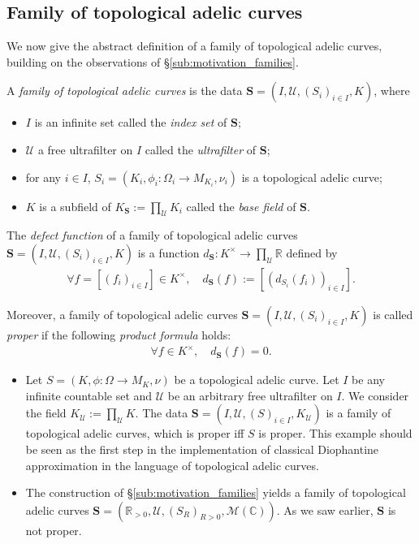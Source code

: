 \documentclass [11pt,reqno]{amsart}
\def\bC{{\mathbb{C}}}
\def\bR{{\mathbb{R}}}
\newcommand{\1}{\mathmybb{1}}
\def\cM{{\mathcal{M}}}
\def\cU{{\mathcal{U}}}
\begin{document}
\subsection{Family of topological adelic curves}
\label{sub:family_tac}

We now give the abstract definition of a family of topological adelic curves, building on the observations of \S \ref{sub:motivation_families}.

\begin{definition}
\label{def:family_of_tac}
A \emph{family of topological adelic curves} is the data $\mathbf{S}=(I,\cU,(S_{i})_{i\in I},K)$, where
\begin{itemize}
	\item $I$ is an infinite set called the \emph{index set} of $\mathbf{S}$;
	\item $\cU$ a free ultrafilter on $I$ called the \emph{ultrafilter} of $\mathbf{S}$;
	\item for any $i\in I$, $S_{i}=(K_{i},\phi_{i}:\Omega_{i}\to M_{K_{i}},\nu_{i})$ is a topological adelic curve;
	\item $K$ is a subfield of $K_{\mathbf{S}}:=\prod_{\cU}K_{i}$ called the \emph{base field} of $\mathbf{S}$. 
\end{itemize}

The \emph{defect function} of a family of topological adelic curves $\mathbf{S}=(I,\cU,(S_{i})_{i\in I},K)$ is a function $d_{\mathbf{S}}:K^{\times}\to \prod_{\cU}\bR$ defined by
\begin{align*}
\forall f=[(f_{i})_{i\in I}]\in K^{\times}, \quad d_{\mathbf{S}}(f) := [(d_{S_{i}}(f_{i}))_{i\in I}].
\end{align*}

Moreover, a family of topological adelic curves $\mathbf{S}=(I,\cU,(S_{i})_{i\in I},K)$ is called \emph{proper} if the following \emph{product formula} holds:
\begin{align*}
\forall f\in K^{\times}, \quad d_{\mathbf{S}}(f) = 0.
\end{align*}
\end{definition}

\begin{example}
\label{example:families_of_tac}
\begin{itemize}
	\item[(1)] Let $S=(K,\phi : \Omega \to M_{K},\nu)$ be a topological adelic curve. Let $I$ be any infinite countable set and $\cU$ be an arbitrary free ultrafilter on $I$. We consider the field $K_{\cU}:=\prod_{\cU}K$. The data $\mathbf{S}=(I,\cU,(S)_{i\in I},K_{\cU})$ is a family of topological adelic curves, which is proper iff $S$ is proper. This example should be seen as the first step in the implementation of classical Diophantine approximation in the language of topological adelic curves.
	\item[(2)] The construction of \S \ref{sub:motivation_families} yields a family of topological adelic curves $\mathbf{S}=(\bR_{>0},\cU,(S_{R})_{R>0},\cM(\bC))$. As we saw earlier, $\mathbf{S}$ is not proper.
\end{itemize}
\end{example}
\end{document}

